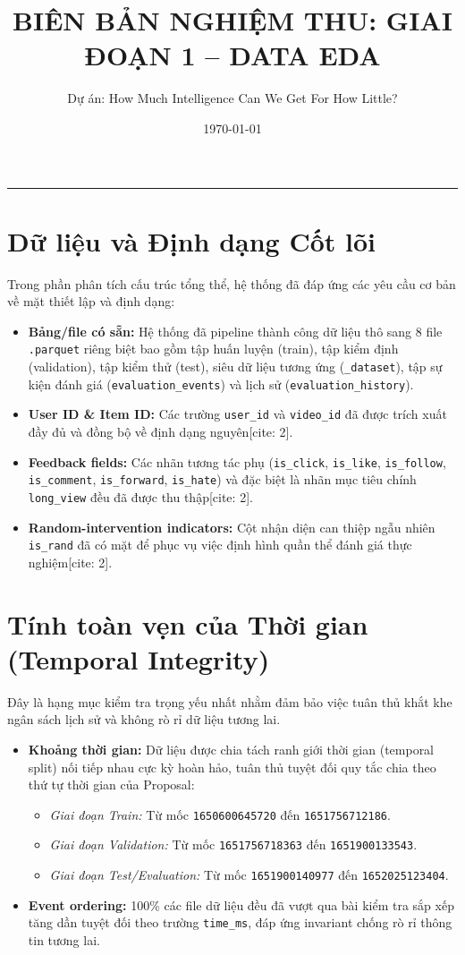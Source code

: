 \documentclass[12pt,a4paper]{article}
\title{\textbf{BIÊN BẢN NGHIỆM THU: GIAI ĐOẠN 1 -- DATA EDA}}
\author{Dự án: How Much Intelligence Can We Get For How Little?}
\date{\today}
\begin{document}
\maketitle
\hrule
\vspace{10pt}

\section{Dữ liệu và Định dạng Cốt lõi}
Trong phần phân tích cấu trúc tổng thể, hệ thống đã đáp ứng các yêu cầu cơ bản về mặt thiết lập và định dạng:
\begin{itemize}
    \item \textbf{Bảng/file có sẵn:} Hệ thống đã pipeline thành công dữ liệu thô sang 8 file \texttt{.parquet} riêng biệt bao gồm tập huấn luyện (train), tập kiểm định (validation), tập kiểm thử (test), siêu dữ liệu tương ứng (\texttt{\_dataset}), tập sự kiện đánh giá (\texttt{evaluation\_events}) và lịch sử (\texttt{evaluation\_history}).
    \item \textbf{User ID \& Item ID:} Các trường \texttt{user\_id} và \texttt{video\_id} đã được trích xuất đầy đủ và đồng bộ về định dạng nguyên[cite: 2].
    \item \textbf{Feedback fields:} Các nhãn tương tác phụ (\texttt{is\_click}, \texttt{is\_like}, \texttt{is\_follow}, \texttt{is\_comment}, \texttt{is\_forward}, \texttt{is\_hate}) và đặc biệt là nhãn mục tiêu chính \texttt{long\_view} đều đã được thu thập[cite: 2].
    \item \textbf{Random-intervention indicators:} Cột nhận diện can thiệp ngẫu nhiên \texttt{is\_rand} đã có mặt để phục vụ việc định hình quần thể đánh giá thực nghiệm[cite: 2].
\end{itemize}

\section{Tính toàn vẹn của Thời gian (Temporal Integrity)}
Đây là hạng mục kiểm tra trọng yếu nhất nhằm đảm bảo việc tuân thủ khắt khe ngân sách lịch sử và không rò rỉ dữ liệu tương lai.
\begin{itemize}
    \item \textbf{Khoảng thời gian:} Dữ liệu được chia tách ranh giới thời gian (temporal split) nối tiếp nhau cực kỳ hoàn hảo, tuân thủ tuyệt đối quy tắc chia theo thứ tự thời gian của Proposal:
    \begin{itemize}
        \item \textit{Giai đoạn Train:} Từ mốc \texttt{1650600645720} đến \texttt{1651756712186}.
        \item \textit{Giai đoạn Validation:} Từ mốc \texttt{1651756718363} đến \texttt{1651900133543}.
        \item \textit{Giai đoạn Test/Evaluation:} Từ mốc \texttt{1651900140977} đến \texttt{1652025123404}.
    \end{itemize}
    \item \textbf{Event ordering:} 100\% các file dữ liệu đều đã vượt qua bài kiểm tra sắp xếp tăng dần tuyệt đối theo trường \texttt{time\_ms}, đáp ứng invariant chống rò rỉ thông tin tương lai.
\end{itemize}
\end{document}

